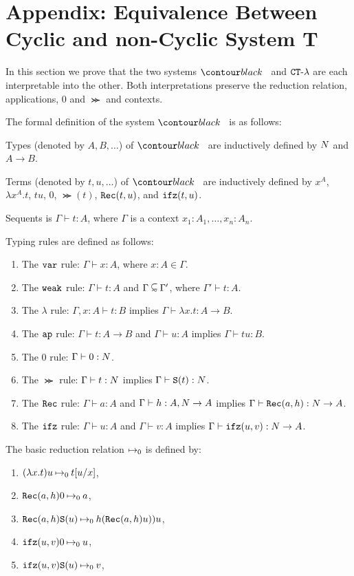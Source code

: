 \newpage

\section{Appendix: Equivalence Between Cyclic and non-Cyclic System T} 
\label{section-equivalence-cyclic-non-cyclic-T}
In this section we prove that the two systems $\systemT$ and ${ {\tt CT} \mbox{-} \lambda}$ 
are each interpretable into the other. 
Both interpretations preserve the reduction relation, applications, $0$ and $\Succ$ and contexts.

The formal definition of the system $\systemT$ is as follows:

Types (denoted by $A,B,\ldots$) of $\systemT$ are inductively defined by ${N}$ and $A\to B$.

Terms (denoted by $t,u,\ldots$) of $\systemT$ are inductively defined by
$x^A$, $\lambda x^A.t$, $tu$, $0$, $\Succ(t)$, ${\tt Rec}(t,u)$, and ${\tt ifz}(t,u)$.

Sequents is $\Gamma\vdash t:A$, where $\Gamma$ is a context $x_1:A_1,\ldots,x_n:A_n$.

Typing rules are defined as follows:
\begin{enumerate}
\item
  The ${\tt var}$ rule: $\Gamma\vdash x:A$, where $x:A\in\Gamma$.
\item
  The ${\tt weak}$ rule: $\Gamma\vdash t:A$ and $\Gamma\subseteqsim \Gamma'$, where $\Gamma'\vdash t:A$.
\item
  The $\lambda$ rule: $\Gamma,x:A\vdash t:B$ implies $\Gamma \vdash \lambda x.t:A\to B$.
\item
  The ${\tt ap}$ rule: $\Gamma\vdash t:A\to B$ and $\Gamma\vdash u:A$ implies $\Gamma \vdash tu:B$.
\item
  The $0$ rule: $\Gamma\vdash 0:{N}$.
\item
  The $\Succ$ rule: $\Gamma\vdash t:{N}$ implies $\Gamma\vdash {\tt S}(t):{N}$.
\item
  The ${\tt Rec}$ rule: $\Gamma\vdash a:A$ and $\Gamma\vdash h:A,{N}\to A$ implies $\Gamma\vdash {\tt Rec}(a,h):{N} \to A$.
\item
  The ${\tt ifz}$ rule: $\Gamma\vdash u:A$ and $\Gamma\vdash v:A$ implies $\Gamma\vdash {\tt ifz}(u,v):{N} \to A$.
\end{enumerate}

The basic reduction relation $\mathbin{\mapsto}_0$ is defined by:
\begin{enumerate}
\item
  $(\lambda x.t)u \mathbin{\mapsto}_0 t[u/x]$, 
\item
  ${\tt Rec}(a,h)0 \mathbin{\mapsto}_0 a$, 
\item
  ${\tt Rec}(a,h){\tt S}(u) \mathbin{\mapsto}_0 h({\tt Rec}(a,h)u))u$, 
\item
  ${\tt ifz}(u,v)0 \mathbin{\mapsto}_0 u$, 
\item
  ${\tt ifz}(u,v){\tt S}(u) \mathbin{\mapsto}_0 v$, 
\end{enumerate}


